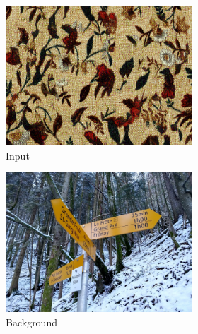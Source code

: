 \begin{figure}[]
    \begin{subfigure}{\textwidth}
        \centering
        \begin{subfigure}{0.24\textwidth}
            \centering
            \includegraphics[width=\textwidth]{images/04-experiment02/photo/flowers2/target.jpg}
            \caption*{Input}
        \end{subfigure}
        \hfill
        \begin{subfigure}{0.24\textwidth}
            \centering
            \includegraphics[width=\textwidth]{images/04-experiment02/photo/bg.jpg}
            \caption*{Background}
        \end{subfigure}
        \hfill
        \begin{subfigure}{0.24\textwidth}

\end{subfigure}
\end{subfigure}
\end{figure}
